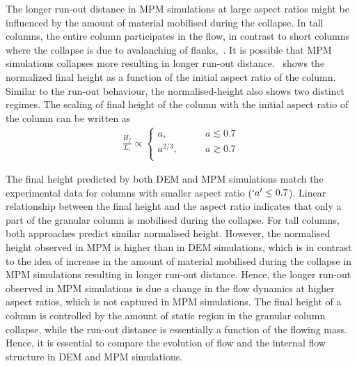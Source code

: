 The longer run-out distance in MPM simulations at large aspect ratios might be 
influenced by the amount of material mobilised during the collapse. In tall 
columns, the entire column participates in the flow, in contrast to short 
columns where the collapse is due to avalanching of 
flanks,~\citet{Lajeunesse2004}. It is possible that MPM simulations 
collapses more resulting in longer run-out distance.~ shows 
the normalized final height as a function of the initial aspect ratio of the 
column. Similar to the run-out behaviour, the normalised-height also shows two 
distinct regimes. The scaling of final height of the column with the initial 
aspect ratio of the column can be written as
\begin{align}
\frac{H_{\textit{f}}}{L_{\textit{i}}} \propto  
\begin{cases}
\textit{a}, \qquad & \textit{a}\lesssim0.7 \\
\textit{a}^{2/3}, \qquad & \textit{a}\gtrsim0.7 \\
\end{cases}
\end{align} 

The final height predicted by both DEM and MPM simulations match the 
experimental data for columns with smaller aspect ratio ($`a' \le 0.7$). Linear 
relationship between the final height and the aspect ratio indicates that only 
a part of the granular column is mobilised during the collapse. For tall 
columns, both approaches predict similar normalised height. However, the 
normalised height observed in MPM is higher than in DEM simulations, which is 
in contrast to the idea of increase in the amount of material mobilised during 
the collapse in MPM simulations resulting in longer run-out distance. Hence, 
the longer run-out observed in MPM simulations is due a change in the 
flow dynamics at higher aspect ratios, which is not captured in MPM 
simulations. The final height of a column is controlled by the amount of static 
region in the granular column collapse, while the run-out distance is 
essentially a function of the flowing mass. Hence, it is essential to compare 
the evolution of flow and the internal flow structure in DEM and MPM 
simulations.


